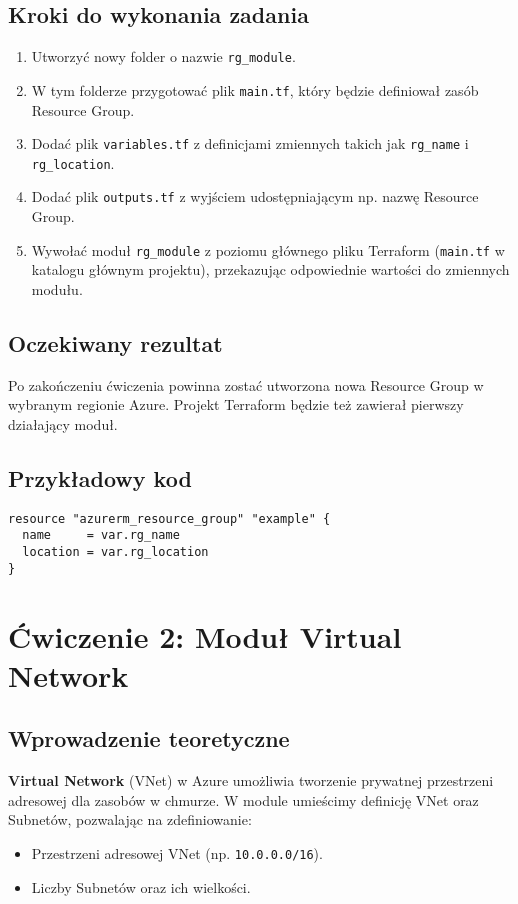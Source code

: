 \documentclass{article}
\begin{document}
\subsection{Kroki do wykonania zadania}
\begin{enumerate}
    \item Utworzyć nowy folder o nazwie \texttt{rg\_module}.
    \item W tym folderze przygotować plik \texttt{main.tf}, który będzie definiował zasób Resource Group.
    \item Dodać plik \texttt{variables.tf} z definicjami zmiennych takich jak \texttt{rg\_name} i \texttt{rg\_location}.
    \item Dodać plik \texttt{outputs.tf} z wyjściem udostępniającym np. nazwę Resource Group.
    \item Wywołać moduł \texttt{rg\_module} z poziomu głównego pliku Terraform (\texttt{main.tf} w katalogu głównym projektu), przekazując odpowiednie wartości do zmiennych modułu.
\end{enumerate}

\subsection{Oczekiwany rezultat}
Po zakończeniu ćwiczenia powinna zostać utworzona nowa Resource Group w wybranym regionie Azure. Projekt Terraform będzie też zawierał pierwszy działający moduł.

\subsection{Przykładowy kod}
\begin{lstlisting}[language=HCL, caption={Tworzenie Resource Group w Terraform}]
resource "azurerm_resource_group" "example" {
  name     = var.rg_name
  location = var.rg_location
}
\end{lstlisting}

\section{Ćwiczenie 2: Moduł Virtual Network}

\subsection{Wprowadzenie teoretyczne}
\textbf{Virtual Network} (VNet) w Azure umożliwia tworzenie prywatnej przestrzeni adresowej dla zasobów w chmurze. W module umieścimy definicję VNet oraz Subnetów, pozwalając na zdefiniowanie:
\begin{itemize}
    \item Przestrzeni adresowej VNet (np. \texttt{10.0.0.0/16}).
    \item Liczby Subnetów oraz ich wielkości.
\end{itemize}
\end{document}
